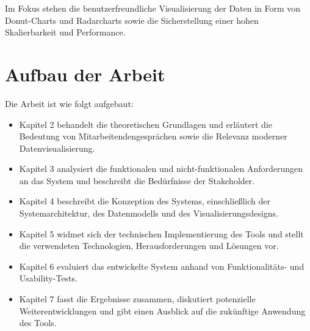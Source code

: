 Im Fokus stehen die benutzerfreundliche Visualisierung der Daten in Form von Donut-Charts und Radarcharts sowie die Sicherstellung einer hohen Skalierbarkeit und Performance.

\section{Aufbau der Arbeit}
Die Arbeit ist wie folgt aufgebaut:
\begin{itemize}
    \item Kapitel 2 behandelt die theoretischen Grundlagen und erläutert die Bedeutung von Mitarbeitendengesprächen sowie die Relevanz moderner Datenvisualisierung.
    \item Kapitel 3 analysiert die funktionalen und nicht-funktionalen Anforderungen an das System und beschreibt die Bedürfnisse der Stakeholder.
    \item Kapitel 4 beschreibt die Konzeption des Systems, einschließlich der Systemarchitektur, des Datenmodells und des Visualisierungsdesigns.
    \item Kapitel 5 widmet sich der technischen Implementierung des Tools und stellt die verwendeten Technologien, Herausforderungen und Lösungen vor.
    \item Kapitel 6 evaluiert das entwickelte System anhand von Funktionalitäts- und Usability-Tests.
    \item Kapitel 7 fasst die Ergebnisse zusammen, diskutiert potenzielle Weiterentwicklungen und gibt einen Ausblick auf die zukünftige Anwendung des Tools.
\end{itemize}
